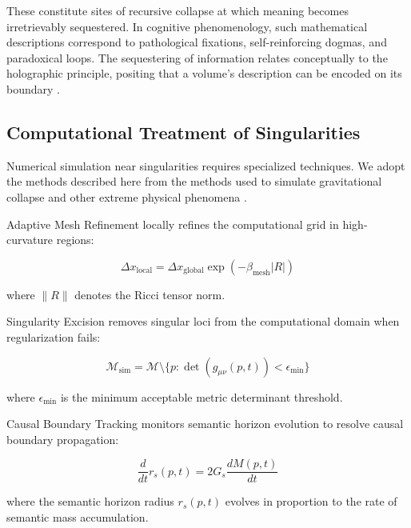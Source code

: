 These constitute sites of recursive collapse at which meaning becomes irretrievably sequestered. In cognitive phenomenology, such mathematical descriptions correspond to pathological fixations, self-reinforcing dogmas, and paradoxical loops. The sequestering of information relates conceptually to the holographic principle, positing that a volume's description can be encoded on its boundary \autocite{tHooft1993, Susskind1995, Maldacena1998}.


\subsection{Computational Treatment of Singularities}
\label{12.2.3:computational_treatment_of_singularities}

Numerical simulation near singularities requires specialized techniques. We adopt the methods described here from the methods used to simulate gravitational collapse and other extreme physical phenomena \autocite{BaumgarteShapiro2010}.

Adaptive Mesh Refinement locally refines the computational grid in high-curvature regions:

\begin{equation}
\Delta x_{\text{local}} = \Delta x_{\text{global}} \exp(-\beta_{\text{mesh}} |R|)
\end{equation}

where \(\|R\|\) denotes the Ricci tensor norm.

Singularity Excision removes singular loci from the computational domain when regularization fails:

\begin{equation}
\mathcal{M}_{\text{sim}} = \mathcal{M} \setminus \{p : \det(g_{\mu\nu}(p, t)) < \epsilon_{\text{min}}\}
\end{equation}

where \(\epsilon_{\text{min}}\) is the minimum acceptable metric determinant threshold.

Causal Boundary Tracking monitors semantic horizon evolution to resolve causal boundary propagation:

\begin{equation}
\frac{d}{dt} r_s(p, t) = 2G_s \frac{dM(p, t)}{dt}
\end{equation}

where the semantic horizon radius \(r_s(p, t)\) evolves in proportion to the rate of semantic mass accumulation.